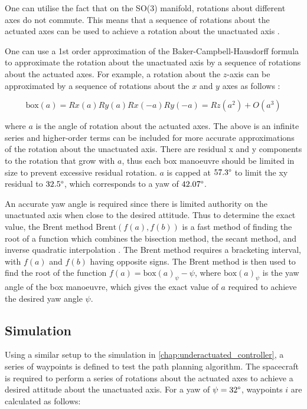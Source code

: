 One can utilise the fact that on the SO(3) manifold, rotations about different axes do not commute. This means that a sequence of rotations about the actuated axes can be used to achieve a rotation about the unactuated axis \cite{murray2017mathematical}.

One can use a 1st order approximation of the Baker-Campbell-Hausdorff formula to approximate the rotation about the unactuated axis by a sequence of rotations about the actuated axes. For example, a rotation about the $z$-axis can be approximated by a sequence of rotations about the $x$ and $y$ axes as follows \cite{Lambert_2021}:

\begin{equation}
\label{eq:box_manoeuvre}
\text{box}(a) = Rx(a)Ry(a)Rx(-a)Ry(-a)  = Rz(a^2) + O(a^3)
\end{equation}

where $a$ is the angle of rotation about the actuated axes. The above is an infinite series and higher-order terms can be included for more accurate approximations of the rotation about the unactuated axis. There are residual x and y components to the rotation that grow with $a$, thus each box manoeuvre should be limited in size to prevent excessive residual rotation. $a$ is capped at $57.3\degree$ to limit the xy residual to $32.5\degree$, which corresponds to a yaw of $42.07\degree$.

An accurate yaw angle is required since there is limited authority on the unactuated axis when close to the desired attitude. Thus to determine the exact value, the Brent method $\text{Brent}(f(a), f(b))$ is a fast method of finding the root of a function which combines the bisection method, the secant method, and inverse quadratic interpolation \cite{BrentqSciPyV1180}. The Brent method requires a bracketing interval, with $f(a)$ and $f(b)$ having opposite signs. The Brent method is then used to find the root of the function $f(a) = \text{box}(a)_{\psi} - \psi$, where $\text{box}(a)_{\psi}$ is the yaw angle of the box manoeuvre, which gives the exact value of $a$ required to achieve the desired yaw angle $\psi$.

\subsection{Simulation}

Using a similar setup to the simulation in \autoref{chap:underactuated_controller}, a series of waypoints is defined to test the path planning algorithm. The spacecraft is required to perform a series of rotations about the actuated axes to achieve a desired attitude about the unactuated axis. For a yaw of $\psi=32\degree$, waypoints $i$ are calculated as follows:

